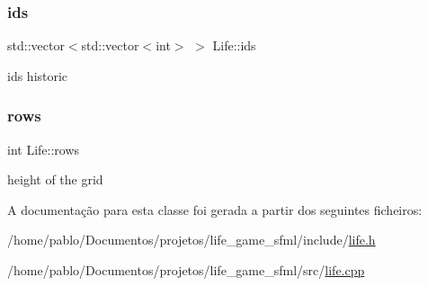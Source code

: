 \subsubsection{\texorpdfstring{ids}{ids}}
{\footnotesize\ttfamily std\+::vector$<$std\+::vector$<$int$>$ $>$ Life\+::ids\hspace{0.3cm}{\ttfamily [private]}}



ids historic 

\mbox{\label{classLife_ab4d1ea4344ba31a4686f388edb7e2927}} 
\subsubsection{\texorpdfstring{rows}{rows}}
{\footnotesize\ttfamily int Life\+::rows\hspace{0.3cm}{\ttfamily [private]}}



height of the grid 



A documentação para esta classe foi gerada a partir dos seguintes ficheiros\+:\begin{DoxyCompactItemize}
\item 
/home/pablo/\+Documentos/projetos/life\+\_\+game\+\_\+sfml/include/\hyperlink{life_8h}{life.\+h}\item 
/home/pablo/\+Documentos/projetos/life\+\_\+game\+\_\+sfml/src/\hyperlink{life_8cpp}{life.\+cpp}\end{DoxyCompactItemize}

